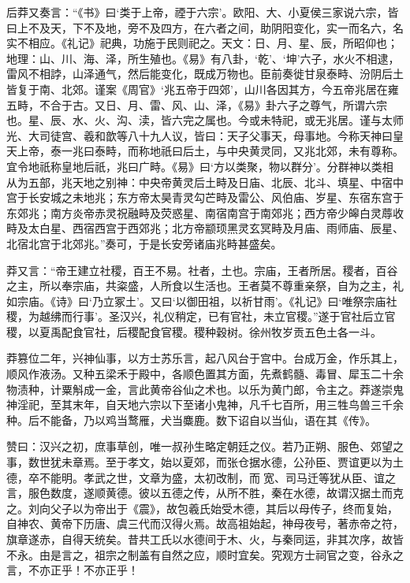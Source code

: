 \documentclass[12pt,UTF8]{ctexbook}
\begin{document}
后莽又奏言：“《书》曰‘类于上帝，禋于六宗’。欧阳、大、小夏侯三家说六宗，皆曰上不及天，下不及地，旁不及四方，在六者之间，助阴阳变化，实一而名六，名实不相应。《礼记》祀典，功施于民则祀之。天文：日、月、星、辰，所昭仰也；地理：山、川、海、泽，所生殖也。《易》有八卦，‘乾’、‘坤’六子，水火不相逮，雷风不相誖，山泽通气，然后能变化，既成万物也。臣前奏徙甘泉泰畤、汾阴后土皆复于南、北郊。谨案《周官》‘兆五帝于四郊’，山川各因其方，今五帝兆居在雍五畤，不合于古。又日、月、雷、风、山、泽，《易》卦六子之尊气，所谓六宗也。星、辰、水、火、沟、渎，皆六完之属也。今或未特祀，或无兆居。谨与太师光、大司徒宫、羲和歆等八十九人议，皆曰：天子父事天，母事地。今称天神曰皇天上帝，泰一兆曰泰畤，而称地祇曰后土，与中央黄灵同，又兆北郊，未有尊称。宜令地祇称皇地后祇，兆曰广畤。《易》曰‘方以类聚，物以群分’。分群神以类相从为五部，兆天地之别神：中央帝黄灵后土畤及日庙、北辰、北斗、填星、中宿中宫于长安城之未地兆；东方帝太昊青灵勾芒畤及雷公、风伯庙、岁星、东宿东宫于东郊兆；南方炎帝赤灵祝融畤及荧惑星、南宿南宫于南郊兆；西方帝少皞白灵蓐收畤及太白星、西宿西宫于西郊兆；北方帝颛顼黑灵玄冥畤及月庙、雨师庙、辰星、北宿北宫于北郊兆。”奏可，于是长安旁诸庙兆畤甚盛矣。



莽又言：“帝王建立社稷，百王不易。社者，土也。宗庙，王者所居。稷者，百谷之主，所以奉宗庙，共粢盛，人所食以生活也。王者莫不尊重亲祭，自为之主，礼如宗庙。《诗》曰‘乃立冢土’。又曰‘以御田祖，以祈甘雨’。《礼记》曰‘唯祭宗庙社稷，为越绋而行事’。圣汉兴，礼仪稍定，已有官社，未立官稷。”遂于官社后立官稷，以夏禹配食官社，后稷配食官稷。稷种穀树。徐州牧岁贡五色土各一斗。



莽篡位二年，兴神仙事，以方士苏乐言，起八风台于宫中。台成万金，作乐其上，顺风作液汤。又种五梁禾于殿中，各顺色置其方面，先煮鹤髓、毒冒、犀玉二十余物渍种，计粟斛成一金，言此黄帝谷仙之术也。以乐为黄门郎，令主之。莽遂崇鬼神淫祀，至其末年，自天地六宗以下至诸小鬼神，凡千七百所，用三牲鸟兽三千余种。后不能备，乃以鸡当鹜雁，犬当麋鹿。数下诏自以当仙，语在其《传》。



赞曰：汉兴之初，庶事草创，唯一叔孙生略定朝廷之仪。若乃正朔、服色、郊望之事，数世犹未章焉。至于孝文，始以夏郊，而张仓据水德，公孙臣、贾谊更以为土德，卒不能明。孝武之世，文章为盛，太初改制，而宽、司马迁等犹从臣、谊之言，服色数度，遂顺黄德。彼以五德之传，从所不胜，秦在水德，故谓汉据土而克之。刘向父子以为帝出于《震》，故包羲氏始受木德，其后以母传子，终而复始，自神农、黄帝下历唐、虞三代而汉得火焉。故高祖始起，神母夜号，著赤帝之符，旗章遂赤，自得天统矣。昔共工氏以水德间于木、火，与秦同运，非其次序，故皆不永。由是言之，祖宗之制盖有自然之应，顺时宜矣。究观方士祠官之变，谷永之言，不亦正乎！不亦正乎！
\end{document}
